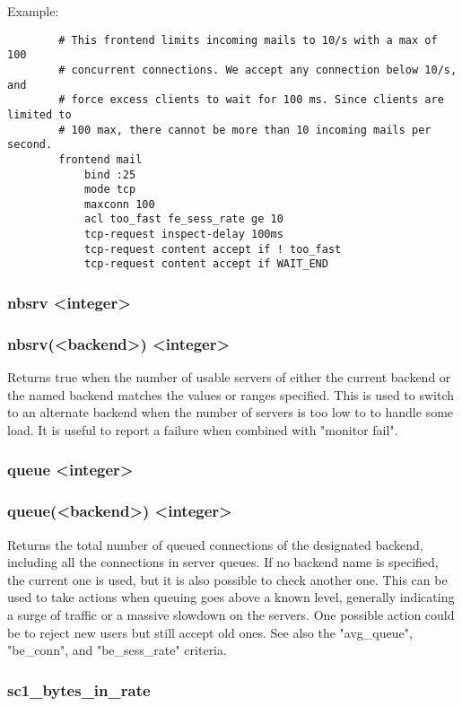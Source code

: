   Example:
  \begin{verbatim}
        # This frontend limits incoming mails to 10/s with a max of 100
        # concurrent connections. We accept any connection below 10/s, and
        # force excess clients to wait for 100 ms. Since clients are limited to
        # 100 max, there cannot be more than 10 incoming mails per second.
        frontend mail
            bind :25
            mode tcp
            maxconn 100
            acl too_fast fe_sess_rate ge 10
            tcp-request inspect-delay 100ms
            tcp-request content accept if ! too_fast
            tcp-request content accept if WAIT_END
  \end{verbatim}

\subsubsection[nbsrv]{nbsrv <integer>}
\subsubsection*{nbsrv(<backend>) <integer>}
  Returns true when the number of usable servers of either the current backend
  or the named backend matches the values or ranges specified. This is used to
  switch to an alternate backend when the number of servers is too low to
  to handle some load. It is useful to report a failure when combined with
  "monitor fail".

\subsubsection[queue]{queue <integer>}
\subsubsection*{queue(<backend>) <integer>}
  Returns the total number of queued connections of the designated backend,
  including all the connections in server queues. If no backend name is
  specified, the current one is used, but it is also possible to check another
  one. This can be used to take actions when queuing goes above a known level,
  generally indicating a surge of traffic or a massive slowdown on the servers.
  One possible action could be to reject new users but still accept old ones.
  See also the "avg\_queue", "be\_conn", and "be\_sess\_rate" criteria.

\subsubsection[sc1\_bytes\_in\_rate]{sc1\_bytes\_in\_rate}
